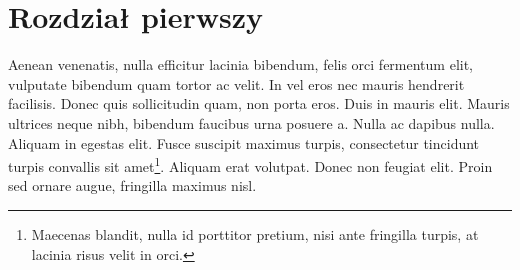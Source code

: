 \documentclass[polish,engineering]{wizthesis}
\begin{document}
\mainmatter %

\chapter{Rozdział pierwszy}

Aenean venenatis, nulla efficitur lacinia bibendum, felis orci fermentum elit, vulputate bibendum quam tortor ac velit. In vel eros nec mauris hendrerit facilisis. Donec quis sollicitudin quam, non porta eros. Duis in mauris elit. Mauris ultrices neque nibh, bibendum faucibus urna posuere a. Nulla ac dapibus nulla. Aliquam in egestas elit. Fusce suscipit maximus turpis, consectetur tincidunt turpis convallis sit amet\footnote{Maecenas blandit, nulla id porttitor pretium, nisi ante fringilla turpis, at lacinia risus velit in orci.}. Aliquam erat volutpat. Donec non feugiat elit. Proin sed ornare augue, fringilla maximus nisl.
\end{document}
